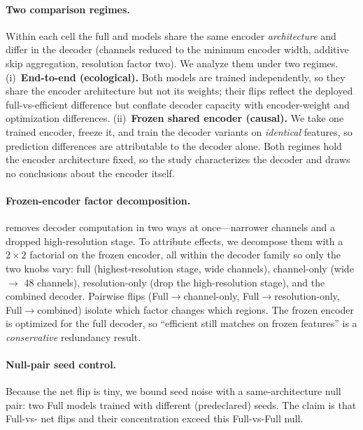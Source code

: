 \paragraph{Two comparison regimes.}
Within each cell the full and \method{} models share the same encoder
\emph{architecture} and differ in the decoder (channels reduced to the minimum
encoder width, additive skip aggregation, resolution factor two).  We analyze them
under two regimes. (i)~\textbf{End-to-end (ecological).} Both models are trained
independently, so they share the encoder architecture but not its weights; their
flips reflect the deployed full-vs-efficient difference but conflate decoder capacity
with encoder-weight and optimization differences. (ii)~\textbf{Frozen shared encoder
(causal).} We take one trained encoder, freeze it, and train the decoder variants on
\emph{identical} features, so prediction differences are attributable to the decoder
alone. Both regimes hold the encoder architecture fixed, so the study characterizes
the decoder and draws no conclusions about the encoder itself.

\paragraph{Frozen-encoder factor decomposition.}
\method{} removes decoder computation in two ways at once---narrower channels and a
dropped high-resolution stage. To attribute effects, we decompose them with a $2\times2$
factorial on the frozen encoder, all within the \method{} decoder family so only the
two knobs vary: full (highest-resolution stage, wide channels), channel-only (wide
$\rightarrow$ 48 channels), resolution-only (drop the high-resolution stage), and the
combined \method{} decoder. Pairwise flips (Full$\rightarrow$channel-only,
Full$\rightarrow$resolution-only, Full$\rightarrow$combined) isolate which factor
changes which regions. The frozen encoder is optimized for the full decoder, so
``efficient still matches on frozen features'' is a \emph{conservative} redundancy
result.

\paragraph{Null-pair seed control.}
Because the net flip is tiny, we bound seed noise with a same-architecture null pair:
two Full models trained with different (predeclared) seeds. The claim is that
Full-vs-\method{} net flips and their concentration exceed this Full-vs-Full null.

